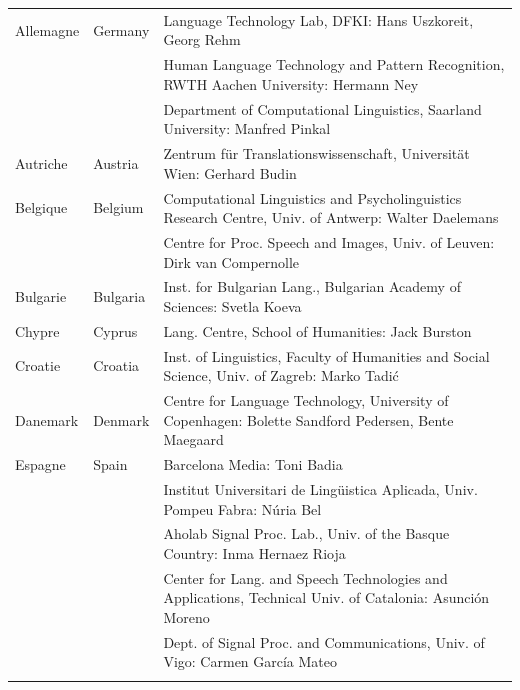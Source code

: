 \small
\begin{longtable}{llp{105mm}}
  Allemagne & \textcolor{grey1}{Germany} &  Language Technology Lab, DFKI: Hans Uszkoreit, Georg Rehm\\ \addlinespace
  & & Human Language Technology and Pattern Recognition, RWTH Aachen University: Hermann Ney \\ \addlinespace
  & & Department of Computational Linguistics, Saarland University: Manfred Pinkal\\ \addlinespace 
  Autriche & \textcolor{grey1}{Austria} & Zentrum für Translationswissenschaft, Universität Wien: Gerhard Budin\\ \addlinespace 

  Belgique & \textcolor{grey1}{Belgium} & Computational Linguistics and Psycholinguistics Research Centre, Univ. of Antwerp: Walter Daelemans\\ \addlinespace
  & & Centre for Proc. Speech and Images, Univ. of Leuven: Dirk van Compernolle \\ \addlinespace

  Bulgarie & \textcolor{grey1}{Bulgaria} & Inst. for Bulgarian Lang., Bulgarian Academy of Sciences: Svetla Koeva \\ \addlinespace

  Chypre & \textcolor{grey1}{Cyprus} & Lang. Centre, School of Humanities: Jack Burston\\ \addlinespace

  Croatie & \textcolor{grey1}{Croatia} & Inst. of Linguistics, Faculty of Humanities and Social Science, Univ. of Zagreb: Marko Tadić \\ \addlinespace

  Danemark &  \textcolor{grey1}{Denmark} & Centre for Language Technology, University of Copenhagen: Bolette Sandford Pedersen, Bente Maegaard\\ \addlinespace

  Espagne & \textcolor{grey1}{Spain} & Barcelona Media: Toni Badia \\ \addlinespace 
  & & Institut Universitari de Lingüistica Aplicada, Univ. Pompeu Fabra: Núria Bel \\ \addlinespace 
  & & Aholab Signal Proc. Lab., Univ. of the Basque Country: Inma Hernaez Rioja \\ \addlinespace 
  & & Center for Lang. and Speech Technologies and Applications, Technical Univ. of Catalonia: Asunción Moreno \\ \addlinespace 
  & & Dept. of Signal Proc. and Communications, Univ. of Vigo: Carmen García Mateo \\ \addlinespace 


\end{longtable}
